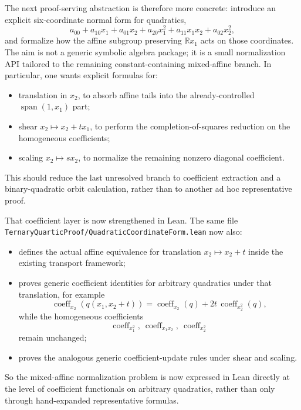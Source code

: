 \documentclass[11pt]{article}
\begin{document}
The next proof-serving abstraction is therefore more concrete: introduce an
explicit six-coordinate normal form for quadratics,
\[
  a_{00} + a_{10} x_1 + a_{01} x_2 + a_{20} x_1^2 + a_{11} x_1x_2 + a_{02} x_2^2,
\]
and formalize how the affine subgroup preserving $\mathbb{R}x_1$ acts on those
coordinates. The aim is not a generic symbolic algebra package; it is a small
normalization API tailored to the remaining constant-containing mixed-affine
branch. In particular, one wants explicit formulas for:
\begin{itemize}
\item translation in $x_2$, to absorb affine tails into the already-controlled
  $\operatorname{span}(1,x_1)$ part;
\item shear $x_2 \mapsto x_2 + t x_1$, to perform the completion-of-squares
  reduction on the homogeneous coefficients;
\item scaling $x_2 \mapsto s x_2$, to normalize the remaining nonzero diagonal
  coefficient.
\end{itemize}
This should reduce the last unresolved branch to coefficient extraction and a
binary-quadratic orbit calculation, rather than to another ad hoc representative
proof.

That coefficient layer is now strengthened in Lean. The same file
\texttt{TernaryQuarticProof/QuadraticCoordinateForm.lean} now also:
\begin{itemize}
\item defines the actual affine equivalence for translation $x_2 \mapsto x_2+t$
  inside the existing transport framework;
\item proves generic coefficient identities for arbitrary quadratics under that
  translation, for example
  \[
    \operatorname{coeff}_{x_2}(q(x_1,x_2+t))
    =
    \operatorname{coeff}_{x_2}(q)+2t\,\operatorname{coeff}_{x_2^2}(q),
  \]
  while the homogeneous coefficients
  \[
    \operatorname{coeff}_{x_1^2},\ \operatorname{coeff}_{x_1x_2},\ \operatorname{coeff}_{x_2^2}
  \]
  remain unchanged;
\item proves the analogous generic coefficient-update rules under shear and
  scaling.
\end{itemize}
So the mixed-affine normalization problem is now expressed in Lean directly at
the level of coefficient functionals on arbitrary quadratics, rather than only
through hand-expanded representative formulas.
\end{document}
